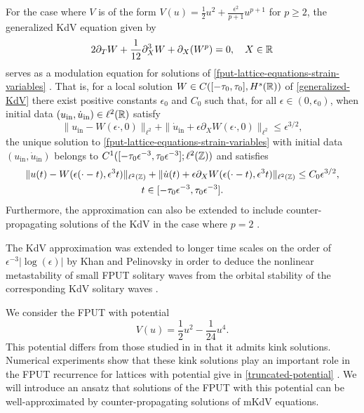 For the case where \(V\) is of the form \(V(u) = \frac 1 2 u^2 + \frac{\epsilon^2}{p+1} u^{p+1}\) for \(p\geq 2\), the generalized KdV equation given by 
\begin{equation}\label{generalized-KdV}
	2 \partial_TW + \frac 1 {12} \partial_X^3 W + \partial_X(W^p) = 0,\quad X\in\mathbb{R}
\end{equation} 
serves as a modulation equation for solutions of \cref{fput-lattice-equations-strain-variables} \cite{bambusi2006metastability,friesecke1999solitary}. That is, for a local solution \(W\in C([-\tau_0,\tau_0],H^s(\mathbb{R}))\) of \cref{generalized-KdV} there exist positive constants \(\epsilon_0\) and \(C_0\) such that, for all \(\epsilon \in (0,\epsilon_0)\), when initial data \((u_{\mathrm{in} }, \dot u_{\mathrm{in}})\in\ell^2(\mathbb{R})\) satisfy
\begin{equation}
	\|u_{\mathrm{in}} - W(\epsilon\cdot, 0) \|_{\ell^2} + \| \dot u_{\mathrm{in}} + \epsilon \partial_X W(\epsilon\cdot, 0) \|_{\ell^2} \leq \epsilon^{3/2},
\end{equation}
the unique solution to \cref{fput-lattice-equations-strain-variables} with initial data \((u_{\mathrm{in} }, \dot u_{\mathrm{in}})\) belongs to \(C^1([-\tau_0\epsilon^{-3}, \tau_0 \epsilon^{-3}];\allowbreak \ell^2(\mathbb{Z}))\) and satisfies 
\begin{multline}
	\|u(t) - W(\epsilon (\cdot - t),\epsilon^3 t)\|_{\ell^2(\mathbb{Z})} + \| \dot u(t) + \epsilon \partial_X W(\epsilon(\cdot - t), \epsilon^3 t) \|_{\ell^2(\mathbb{Z})} \leq C_0 \epsilon^{3/2}, \\ t\in[-\tau_0 \epsilon^{-3},\tau_0 \epsilon^{-3}].
\end{multline}
Furthermore, the approximation can also be extended to include counter-propagating solutions of the KdV in the case where \(p=2\) \cite{schneider2000counter,hong2021korteweg}.

The KdV approximation was extended to longer time scales on the order of \(\epsilon^{-3}|\log(\epsilon)|\) by Khan and Pelinovsky in order to deduce the nonlinear metastability of small FPUT solitary waves from the orbital stability of the corresponding KdV solitary waves \cite{khan2017long}.

We consider the FPUT with potential
\begin{equation}\label{truncated-potential}
	V(u) = \frac 1 2 u^2 - \frac{1} {24} u^4.
\end{equation}
This potential differs from those studied in \cite{khan2017long} in that it admits kink solutions. Numerical experiments show that these kink solutions play an important role in the FPUT recurrence for lattices with potential give in \cref{truncated-potential} \cite{pace2019beta}. We will introduce an ansatz that solutions of the FPUT with this potential can be well-approximated by counter-propagating solutions of mKdV equations.

